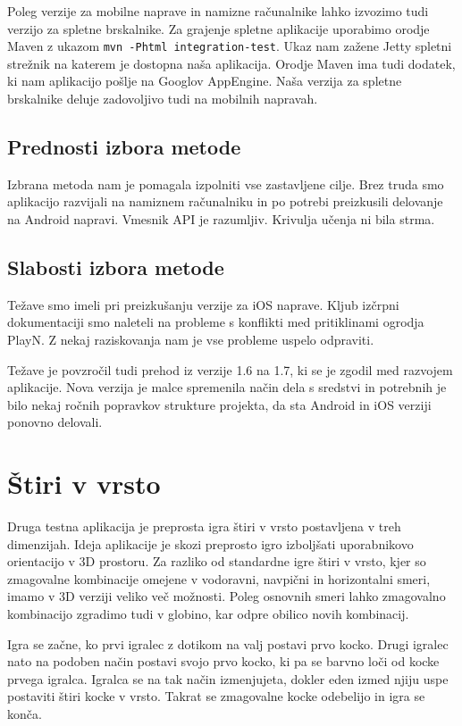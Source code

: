 Poleg verzije za mobilne naprave in namizne računalnike lahko izvozimo tudi verzijo za spletne brskalnike. Za grajenje spletne aplikacije uporabimo orodje Maven z ukazom \texttt{mvn -Phtml integration-test}. Ukaz nam zažene Jetty spletni strežnik na katerem je dostopna naša aplikacija. Orodje Maven ima tudi dodatek, ki nam aplikacijo pošlje na Googlov AppEngine. Naša verzija za spletne brskalnike deluje zadovoljivo tudi na mobilnih napravah.

\subsection{Prednosti izbora metode}

Izbrana metoda nam je pomagala izpolniti vse zastavljene cilje. Brez truda smo aplikacijo razvijali na namiznem računalniku in po potrebi preizkusili delovanje na Android napravi. Vmesnik API je razumljiv. Krivulja učenja ni bila strma. 

\subsection{Slabosti izbora metode}

Težave smo imeli pri preizkušanju verzije za iOS naprave. Kljub izčrpni dokumentaciji smo naleteli na probleme s konflikti med pritiklinami ogrodja PlayN. Z nekaj raziskovanja nam je vse probleme uspelo odpraviti. 

Težave je povzročil tudi prehod iz verzije 1.6 na 1.7, ki se je zgodil med razvojem aplikacije. Nova verzija je malce spremenila način dela s sredstvi in potrebnih je bilo nekaj ročnih popravkov strukture projekta, da sta Android in iOS verziji ponovno delovali.

\section{Štiri v vrsto}

Druga testna aplikacija je preprosta igra štiri v vrsto postavljena v treh dimenzijah. Ideja aplikacije je skozi preprosto igro izboljšati uporabnikovo orientacijo v 3D prostoru. Za razliko od standardne igre štiri v vrsto, kjer so zmagovalne kombinacije omejene v vodoravni, navpični in horizontalni smeri, imamo v 3D verziji veliko več možnosti. Poleg osnovnih smeri lahko zmagovalno kombinacijo zgradimo tudi v globino, kar odpre obilico novih kombinacij.

Igra se začne, ko prvi igralec z dotikom na valj postavi prvo kocko. Drugi igralec nato na podoben način postavi svojo prvo kocko, ki pa se barvno loči od kocke prvega igralca. Igralca se na tak način izmenjujeta, dokler eden izmed njiju uspe postaviti štiri kocke v vrsto. Takrat se zmagovalne kocke odebelijo in igra se konča.


